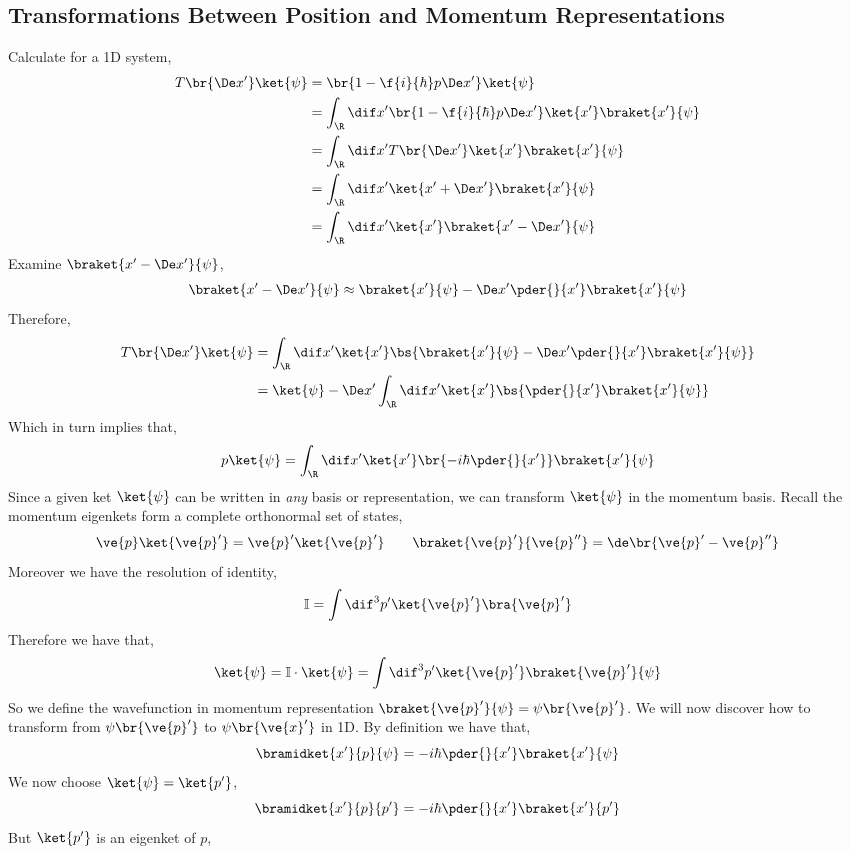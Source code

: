 \documentclass{article}
\begin{document}
\subsection{Transformations Between Position and Momentum Representations}
Calculate for a 1D system,
\begin{align*}
    T\br{\De x'}\ket{\psi} &= \br{1 - \f{i}{\hbar} p \De x'}\ket{\psi}\\
    &= \int_{\R} \dif x' \br{1 - \f{i}{\hbar} p \De x'}\ket{x'}\braket{x'}{\psi}\\
    &= \int_{\R} \dif x' T\br{\De x'}\ket{x'}\braket{x'}{\psi}\\
    &= \int_{\R} \dif x'\ket{x' + \De x'}\braket{x'}{\psi}\\
    &= \int_{\R} \dif x'\ket{x'}\braket{x' - \De x'}{\psi}
\end{align*}
Examine $\braket{x' - \De x'}{\psi}$,
\begin{align*}
    \braket{x' - \De x'}{\psi} \approx \braket{x'}{\psi} - \De x' \pder{}{x'}\braket{x'}{\psi}
\end{align*}
Therefore,
\begin{align*}
    T\br{\De x'}\ket{\psi} &= \int_{\R} \dif x'\ket{x'}\bs{\braket{x'}{\psi} - \De x' \pder{}{x'}\braket{x'}{\psi}} \\
    &= \ket{\psi} - \De x' \int_{\R} \dif x'\ket{x'}\bs{ \pder{}{x'}\braket{x'}{\psi}} \\
\end{align*}
Which in turn implies that,
\[ p \ket{\psi} = \int_{\R} \dif x'\ket{x'}\br{-i\hbar \pder{}{x'}}\braket{x'}{\psi} \]
Since a given ket $\ket{\psi}$ can be written in \textit{any} basis or representation, we can transform $\ket{\psi}$ in the momentum basis. Recall the momentum eigenkets form a complete orthonormal set of states,
\[ \ve{p} \ket{\ve{p}'} = \ve{p}'\ket{\ve{p}'} \qquad \braket{\ve{p}'}{\ve{p}''} = \de\br{\ve{p}' - \ve{p}''} \]
Moreover we have the resolution of identity,
\[ \mathbb{I} = \int \dif^3 p' \ket{\ve{p}'}\bra{\ve{p}'} \]
Therefore we have that,
\[ \ket{\psi} = \mathbb{I} \cdot \ket{\psi} = \int \dif^3 p' \ket{\ve{p}'}\braket{\ve{p}'}{\psi} \]
So we define the wavefunction in momentum representation $\braket{\ve{p}'}{\psi} = \psi\br{\ve{p}'}$. We will now discover how to transform from $\psi\br{\ve{p}'}$ to $\psi\br{\ve{x}'}$ in 1D. By definition we have that,
\[ \bramidket{x'}{p}{\psi} = - i \hbar \pder{}{x'} \braket{x'}{\psi} \]
We now choose $\ket{\psi} = \ket{p'}$,
\[ \bramidket{x'}{p}{p'} = - i \hbar \pder{}{x'} \braket{x'}{p'} \]
But $\ket{p'}$ is an eigenket of $p$,
\end{document}
